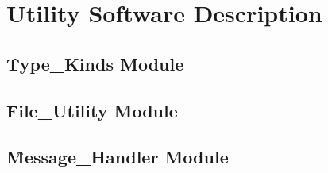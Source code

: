 \chapter{Utility Software Description}

\section{\f{Type\_Kinds} Module}
\label{sec:utility_type_kinds}


\section{\f{File\_Utility} Module}
\label{sec:utility_file_utility}


\section{\f{Message\_Handler} Module}
\label{sec:utility_message_handler}
